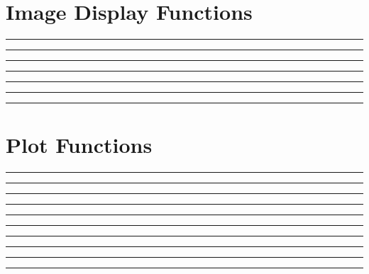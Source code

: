 \documentclass{book}
\begin{document}
\section{Image Display Functions}

\hrule

\hrule

\hrule

\hrule

\hrule

\hrule

\hrule


\section{Plot Functions}

\hrule

\hrule

\hrule

\hrule

\hrule

\hrule

\hrule

\hrule

\hrule

\hrule

\end{document}
